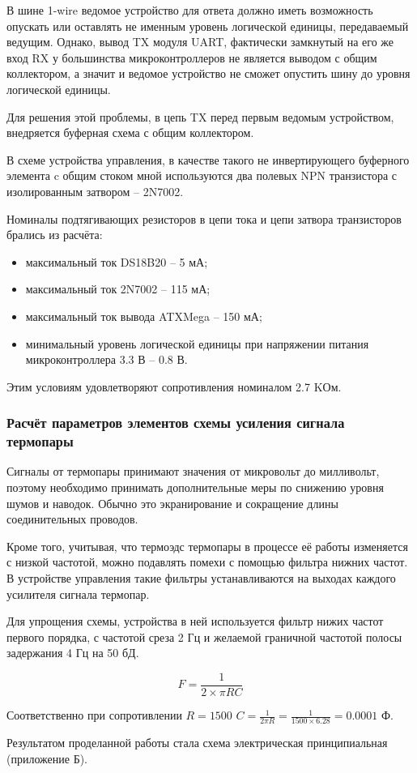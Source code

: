 В шине 1-wire ведомое устройство для ответа должно иметь возможность
опускать или оставлять не именным уровень логической единицы,
передаваемый ведущим.
Однако, вывод TX модуля UART, фактически замкнутый на его же вход RX у большинства
микроконтроллеров не является выводом с общим коллектором, а значит и ведомое
устройство не сможет опустить шину до уровня логической единицы.

Для решения этой проблемы, в цепь TX перед первым ведомым устройством, внедряется
буферная схема с общим коллектором.

В схеме устройства управления, в качестве такого не инвертирующего буферного
элемента c общим стоком мной используются два полевых NPN транзистора с изолированным
затвором -- 2N7002.

Номиналы подтягивающих резисторов в цепи тока и цепи затвора транзисторов брались из расчёта:
\begin{itemize}
	\item максимальный ток DS18B20 -- 5 мА;
	\item максимальный ток 2N7002 -- 115 мА;
	\item максимальный ток вывода ATXMega -- 150 мА;
	\item минимальный уровень логической единицы при напряжении
		питания микроконтроллера 3.3 В -- 0.8 В.
\end{itemize}
Этим условиям удовлетворяют сопротивления номиналом 2.7 KОм.


\subsubsection{Расчёт параметров элементов схемы усиления сигнала термопары}
Сигналы от термопары принимают значения от микровольт до милливольт, поэтому необходимо принимать
дополнительные меры по снижению уровня шумов и наводок.
Обычно это экранирование и сокращение длины соединительных проводов.

Кроме того, учитывая, что термоэдс термопары в процессе её работы изменяется
с низкой частотой, можно подавлять помехи с помощью
фильтра нижних частот. В устройстве управления такие фильтры устанавливаются на выходах
каждого усилителя сигнала термопар.

Для упрощения схемы, устройства в ней используется фильтр нижих частот первого порядка, с
частотой среза 2 Гц и желаемой граничной частотой полосы задержания 4 Гц на 50 бД.

\begin{equation}
	F = \frac{1} {2 \times{} \pi{} RC}
\end{equation}

Соответственно при сопротивлении  $R = 1500$
$C = \frac{1}{2\pi{}R} = \frac{1}{1500 \times{} 6.28} = 0.0001$ Ф.


Результатом проделанной работы стала схема электрическая принципиальная (приложение Б).
